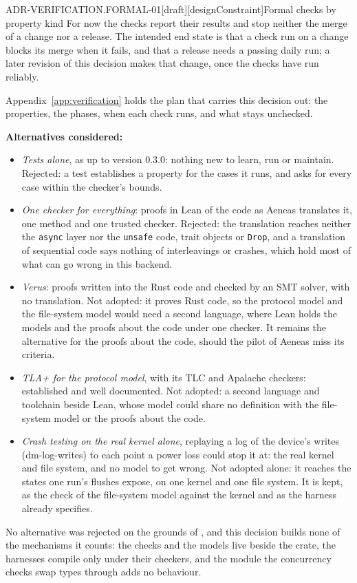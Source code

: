 \begin{requirement}{ADR-VERIFICATION.FORMAL-01}[draft][designConstraint]{Formal checks by property kind}
  For now the checks report their results and stop neither the merge of a
  change nor a release. The intended end state is that a check run on a
  change blocks its merge when it fails, and that a release needs a passing
  daily run; a later revision of this decision makes that change, once the
  checks have run reliably.

  Appendix~\ref{app:verification} holds the plan that carries this decision
  out: the properties, the phases, when each check runs, and what stays
  unchecked.

  \textbf{Alternatives considered:}
  \begin{itemize}
    \item \emph{Tests alone}, as up to version 0.3.0: nothing new to learn,
      run or maintain. Rejected: a test establishes a property for the cases
      it runs, and  asks for every case
      within the checker's bounds.
    \item \emph{One checker for everything}: proofs in Lean of the code as
      Aeneas translates it, one method and one trusted checker. Rejected:
      the translation reaches neither the \texttt{async} layer nor the
      \texttt{unsafe} code, trait objects or \texttt{Drop}, and a
      translation of sequential code says nothing of interleavings or
      crashes, which hold most of what can go wrong in this backend.
    \item \emph{Verus}: proofs written into the Rust code and checked by an
      SMT solver, with no translation. Not adopted: it proves Rust code, so
      the protocol model and the file-system model would need a second
      language, where Lean holds the models and the proofs about the code
      under one checker. It remains the alternative for the proofs about the
      code, should the pilot of Aeneas miss its criteria.
    \item \emph{TLA+ for the protocol model}, with its TLC and Apalache
      checkers: established and well documented. Not adopted: a second
      language and toolchain beside Lean, whose model could share no
      definition with the file-system model or the proofs about the code.
    \item \emph{Crash testing on the real kernel alone}, replaying a log of
      the device's writes (dm-log-writes) to each point a power loss could
      stop it at: the real kernel and file system, and no model to get
      wrong. Not adopted alone: it reaches the states one run's flushes
      expose, on one kernel and one file system. It is kept, as the check of
      the file-system model against the kernel and as the harness
       already specifies.
  \end{itemize}
  No alternative was rejected on the grounds of ,
  and this decision builds none of the mechanisms it counts: the checks and
  the models live beside the crate, the harnesses compile only under their
  checkers, and the module the concurrency checks swap types through adds no
  behaviour.


\end{requirement}
